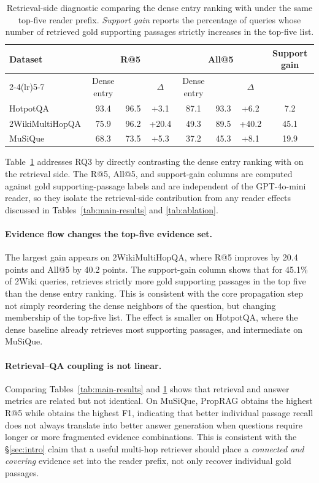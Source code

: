 \begin{table}[t]
\centering
\small
\setlength{\tabcolsep}{4pt}
\begin{tabular}{lccc ccc c}
\toprule
Dataset & \multicolumn{3}{c}{R@5} &
\multicolumn{3}{c}{All@5} &
Support gain \\
\cmidrule(lr){2-4}\cmidrule(lr){5-7}
& Dense entry & \methodname{} & $\Delta$ &
Dense entry & \methodname{} & $\Delta$ & \\
\midrule
HotpotQA & 93.4 & 96.5 & +3.1 & 87.1 & 93.3 & +6.2 & 7.2 \\
2WikiMultiHopQA & 75.9 & 96.2 & +20.4 & 49.3 & 89.5 & +40.2 & 45.1 \\
MuSiQue & 68.3 & 73.5 & +5.3 & 37.2 & 45.3 & +8.1 & 19.9 \\
\bottomrule
\end{tabular}
\caption{Retrieval-side diagnostic comparing the dense entry ranking
with \methodname{} under the same top-five reader prefix.
\emph{Support gain} reports the percentage of queries whose number of
retrieved gold supporting passages strictly increases in the top-five
list.}
\label{tab:flow-diagnostic}
\end{table}

Table~\ref{tab:flow-diagnostic} addresses RQ3 by directly contrasting
the dense entry ranking with \methodname{} on the retrieval side.
The R@5, All@5, and support-gain columns are computed against gold
supporting-passage labels and are independent of the GPT-4o-mini
reader, so they isolate the retrieval-side contribution from any
reader effects discussed in Tables~\ref{tab:main-results} and
\ref{tab:ablation}.
\paragraph{Evidence flow changes the top-five evidence set.}
The largest gain appears on 2WikiMultiHopQA, where R@5 improves by
20.4 points and All@5 by 40.2 points. The support-gain column shows
that for 45.1\% of 2Wiki queries, \methodname{} retrieves strictly
more gold supporting passages in the top five than the dense entry
ranking. This is consistent with the core propagation step not simply
reordering the dense neighbors of the question, but changing
membership of the top-five list. The effect is smaller on HotpotQA,
where the dense baseline already retrieves most supporting passages,
and intermediate on MuSiQue.

\paragraph{Retrieval--QA coupling is not linear.}
Comparing Tables~\ref{tab:main-results} and \ref{tab:flow-diagnostic}
shows that retrieval and answer metrics are related but not identical.
On MuSiQue, PropRAG obtains the highest R@5 while \methodname{} obtains
the highest F1, indicating that better individual passage recall does
not always translate into better answer generation when questions
require longer or more fragmented evidence combinations. This is
consistent with the \S\ref{sec:intro} claim that a useful multi-hop
retriever should place a \emph{connected and covering} evidence set
into the reader prefix, not only recover individual gold passages.

